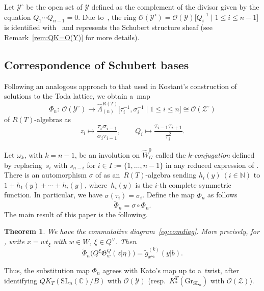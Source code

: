 \documentclass[pdftex]{sigma}
\numberwithin{equation}{section}
\newcommand{\C}{\mathbb{C}}
\newcommand{\Gr}{\mathrm{Gr}}
\newcommand{\Gro}[1]{\mathfrak{G}^Q_{#1}}
\renewcommand{\O}{\mathscr{O}}
\newcommand{\Rep}{{R(T)}}
\newcommand{\SL}{\mathrm{SL}}
\newtheorem{Theorem}{Theorem}[section]
\theoremstyle{definition}
\begin{document}
Let $\mathscr{Y}^\circ$ be the open set of $\mathscr{Y}$ defined as the complement of the divisor given by the equation $Q_1\cdots Q_{n-1}=0$.
Due to~\cite{MNS2}, the ring $\mathscr{O}(\mathscr{Y}^\circ)=\mathscr{O}(\mathscr{Y})\big[Q_i^{-1}\mid 1\leq i\leq n-1\big]$
is identified with~\smash{$QK_T^{\mathrm{pol}}(\SL_n(\C)/B)_Q$}
and  represents the Schubert structure sheaf  (see Remark~\ref{rem:QK=O(Y)} for more details).

\subsection{Correspondence of Schubert bases}
Following an analogous approach to that used in Kostant's construction of solutions to the Toda lattice, we obtain a~map
\[\Phi_n\colon \ \mathscr{O}(\mathscr{Y}^\circ)
\longrightarrow \hat{\Lambda}^{\Rep}_{(n)}\big[\tau_i^{-1},\sigma_i^{-1}\mid 1\leq i\leq n\big]
\cong\mathscr{O}(\mathscr{Z}^\circ)\]
of $\Rep$-algebras as
\begin{equation}
z_i\mapsto \frac{\tau_i\sigma_{i-1}}{\sigma_i \tau_{i-1}},\qquad
Q_i\mapsto \frac{\tau_{i-1}\tau_{i+1}}{\tau_i^2}.\label{eq:Phi}
\end{equation}

Let $\omega_k$, with $k=n-1$, be an involution on $\hat{W}_G^0$ called the $k$-\emph{conjugation} defined by replacing~$s_i$ with $s_{n-i}$ for $i \in I:=\{1,\dots,n-1\}$ in any reduced expression of .
There is an automorphism $\sigma$ of \smash{$\hat{\Lambda}^{\Rep}_{(n)}$} as an~$\Rep$-algebra
sending $h_i(y)\ (i\in\mathbb{N})$ to $1+h_1(y)+\cdots+h_i(y)$, where~$h_i(y)$ is the
$i$-th complete symmetric function.
In particular, we have $\sigma(\tau_i)=\sigma_i$.
Define the map $\tilde{\Phi}_n$ as follows
\begin{equation}
\label{eq:tPhi}
\tilde{\Phi}_n=\sigma \circ \Phi_n.
\end{equation}
The main result of this paper is the following.
\begin{Theorem}\label{thm:main}
We have the commutative diagram~\eqref{eq:comdiag}. More precisely,
for , write $x=wt_\xi$ with $w\in W$, $\xi\in Q^\vee$. Then
\[
\tilde{\Phi}_n\bigl(
Q^\xi \Gro{w}(z| \eta)\bigr)=
\tilde{g}_{x^{\omega_k}}^{(k)}(y|b).
\]
\end{Theorem}
Thus, the substitution map ${\Phi}_n$ agrees with Kato's map up to a~twist, after identifying
 $QK_T(\SL_n(\C)/B)$ with $\mathscr{O}(\mathscr{Y})$ \big(resp.\ $K_*^T(\Gr_{\SL_n})$ with $\O(\mathscr{Z})$\big).
\end{document}
